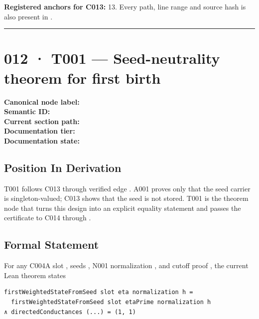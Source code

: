 \textbf{Registered anchors for C013:} 13. Every path, line range and
source hash is also present in
\texttt{\protect{}}.

\begin{center}\rule{0.5\linewidth}{0.5pt}\end{center}

\section{012 · T001 --- Seed-neutrality theorem for first
birth}\label{t001-seed-neutrality-theorem-for-first-birth}

\textbf{Canonical node label:} \texttt{\protect{}}\\
\textbf{Semantic ID:} \texttt{\protect{}}\\
\textbf{Current section path:} \texttt{\protect{}}\\
\textbf{Documentation tier:} \texttt{\protect{}}\\
\textbf{Documentation state:} \texttt{\protect{}}

\subsection{Position In Derivation}\label{position-in-derivation-8}

T001 follows C013 through verified edge \texttt{\protect{}}. A001 proves only
that the seed carrier is singleton-valued; C013 shows that the seed is
not stored. T001 is the theorem node that turns this design into an
explicit equality statement and passes the certificate to C014 through
\texttt{\protect{}}.

\subsection{Formal Statement}\label{formal-statement-2}

For any C004A slot \texttt{\protect{}}, seeds
\texttt{\protect{}}, N001 normalization
\texttt{\protect{}}, and cutoff proof \texttt{\protect{}}, the current Lean
theorem states

\begin{verbatim}
firstWeightedStateFromSeed slot eta normalization h =
  firstWeightedStateFromSeed slot etaPrime normalization h
∧ directedConductances (...) = (1, 1)
\end{verbatim}

